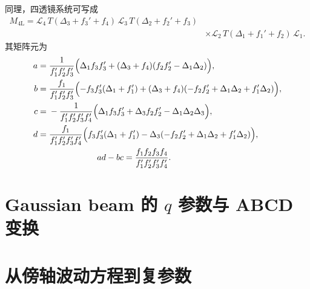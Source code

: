 \begin{exbox}[title=四薄透镜验证例]
	同理，四透镜系统可写成
	\begin{align*}
		M_{4\mathrm{L}}
		={}\mathcal L_4\,T(\Delta_3+f_3'+f_4)\,
		\mathcal L_3\,T(\Delta_2+f_2'+f_3)\\
		&\times\mathcal L_2\,T(\Delta_1+f_1'+f_2)\,\mathcal L_1.
	\end{align*}
	其矩阵元为
	\begin{align*}
		a={}&\frac{1}{f_1'f_2'f_3'}
		\Bigl(\Delta_1f_3f_3'+(\Delta_3+f_4)(f_2f_2'-\Delta_1\Delta_2)\Bigr),\\
		b={}&\frac{f_1}{f_1'f_2'f_3'}
		\Bigl(-f_3f_3'(\Delta_1+f_1')
		+(\Delta_3+f_4)(-f_2f_2'+\Delta_1\Delta_2+f_1'\Delta_2)\Bigr),\\
		c={}&-\frac{1}{f_1'f_2'f_3'f_4'}
		\Bigl(\Delta_1f_3f_3'+\Delta_3f_2f_2'
		-\Delta_1\Delta_2\Delta_3\Bigr),\\
		d={}&\frac{f_1}{f_1'f_2'f_3'f_4'}
		\Bigl(f_3f_3'(\Delta_1+f_1')
		-\Delta_3(-f_2f_2'+\Delta_1\Delta_2+f_1'\Delta_2)\Bigr),\\
		&\hspace{2cm}
		ad-bc=\frac{f_1f_2f_3f_4}{f_1'f_2'f_3'f_4'}.
	\end{align*}
\end{exbox}

\section{Gaussian beam 的 \(q\) 参数与 ABCD 变换}

\section{从傍轴波动方程到复参数}

